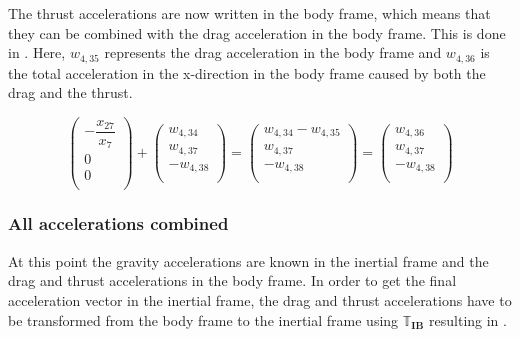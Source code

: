 The thrust accelerations are now written in the body frame, which means that they can be combined with the drag acceleration in the body frame. This is done in . Here, $w_{4,35}$ represents the drag acceleration in the body frame and $w_{4,36}$ is the total acceleration in the x-direction in the body frame caused by both the drag and the thrust.


\begin{equation} \label{eq:DandTBody}
\begin{pmatrix}
-\dfrac{x_{27}}{x_{7}}\\
0\\
0\\
\end{pmatrix}
+
\begin{pmatrix}
w_{4,34}\\
w_{4,37}\\
-w_{4,38}\\
\end{pmatrix}
=
\begin{pmatrix}
w_{4,34}-w_{4,35}\\
w_{4,37}\\
-w_{4,38}\\
\end{pmatrix}
=
\begin{pmatrix}
w_{4,36}\\
w_{4,37}\\
-w_{4,38}\\
\end{pmatrix}
\end{equation}

\subsubsection{All accelerations combined}
\label{subsubsec:allAcc}
At this point the gravity accelerations are known in the inertial frame and the drag and thrust accelerations in the body frame. In order to get the final acceleration vector in the inertial frame, the drag and thrust accelerations have to be transformed from the body frame to the inertial frame using $\mathbb{T}_{\mathbf{IB}}$ resulting in .



